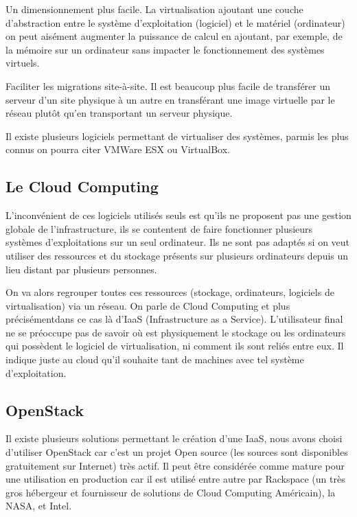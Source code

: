 \documentclass{report}
\begin{document}
Un dimensionnement plus facile. La virtualisation ajoutant une couche d’abstraction entre le système d’exploitation (logiciel) et le matériel (ordinateur) on peut aisément augmenter la puissance de calcul en ajoutant, par exemple, de la mémoire sur un ordinateur sans impacter le fonctionnement des systèmes virtuels.

Faciliter les migrations site-à-site. Il est beaucoup plus facile de transférer un serveur d’un site physique à un autre en transférant une image virtuelle par le réseau plutôt qu’en transportant un serveur physique.\newline

Il existe plusieurs logiciels permettant de virtualiser des systèmes, parmis les plus connus on pourra citer VMWare ESX ou VirtualBox.

\subsection{Le Cloud Computing}
L’inconvénient de ces logiciels utilisés seuls est qu’ils ne proposent pas une gestion globale de l’infrastructure, ils se contentent de faire fonctionner plusieurs systèmes d’exploitations sur un seul ordinateur. Ils ne sont pas adaptés si on veut utiliser des ressources et du stockage présents sur plusieurs ordinateurs depuis un lieu distant par plusieurs personnes.

On va alors regrouper toutes ces ressources (stockage, ordinateurs, logiciels de virtualisation) via un réseau. On parle de Cloud Computing et plus précisément\footnotemark[1] dans ce cas là d’IaaS (Infrastructure as a Service).
L’utilisateur final ne se préoccupe pas de savoir où est physiquement le stockage ou les ordinateurs qui possèdent le logiciel de virtualisation, ni comment ils sont reliés entre eux. Il indique juste au cloud qu’il souhaite tant de machines avec tel système d’exploitation.


\subsection{OpenStack}
Il existe plusieurs solutions permettant le création d’une IaaS, nous avons choisi d’utiliser OpenStack car c’est un projet Open source (les sources sont disponibles gratuitement sur Internet) très actif.
Il peut être considérée comme mature pour une utilisation en production car il est utilisé entre autre par Rackspace (un très gros hébergeur et fournisseur de solutions de Cloud Computing Américain), la NASA, et Intel.
\end{document}
